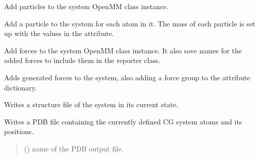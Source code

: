\documentclass[letterpaper,10pt,english]{sphinxmanual}
\begin{document}
\begin{fulllineitems}
\begin{fulllineitems}
\label{\detokenize{modules/system:hps.core.system.addParticles}}
\pysigstartsignatures
{}
\pysigstopsignatures
\sphinxAtStartPar
Add particles to the system OpenMM class instance.

\sphinxAtStartPar
Add a particle to the system for each atom in it. The mass
of each particle is set up with the values in the 
attribute.

\end{fulllineitems}


\begin{fulllineitems}
\label{\detokenize{modules/system:hps.core.system.addSystemForces}}
\pysigstartsignatures
{}
\pysigstopsignatures
\sphinxAtStartPar
Add forces to the system OpenMM class instance. It also save
names for the added forces to include them in the reporter class.

\sphinxAtStartPar
Adds generated forces to the system, also adding
a force group to the  attribute dictionary.

\end{fulllineitems}


\begin{fulllineitems}
\label{\detokenize{modules/system:hps.core.system.dumpStructure}}
\pysigstartsignatures
{}
\pysigstopsignatures
\sphinxAtStartPar
Writes a structure file of the system in its current state.

\sphinxAtStartPar
Writes a PDB file containing the currently defined CG system atoms and its positions.
\begin{quote}\begin{description}
\sphinxAtStartPar
{} () \textendash{} name of the PDB output file.


\end{description}
\end{quote}
\end{fulllineitems}
\end{fulllineitems}
\end{document}
